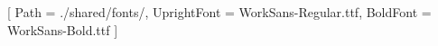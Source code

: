 \setmainfont{WorkSans}
[
	Path = ./shared/fonts/,
	UprightFont = WorkSans-Regular.ttf,
	BoldFont = WorkSans-Bold.ttf
]
